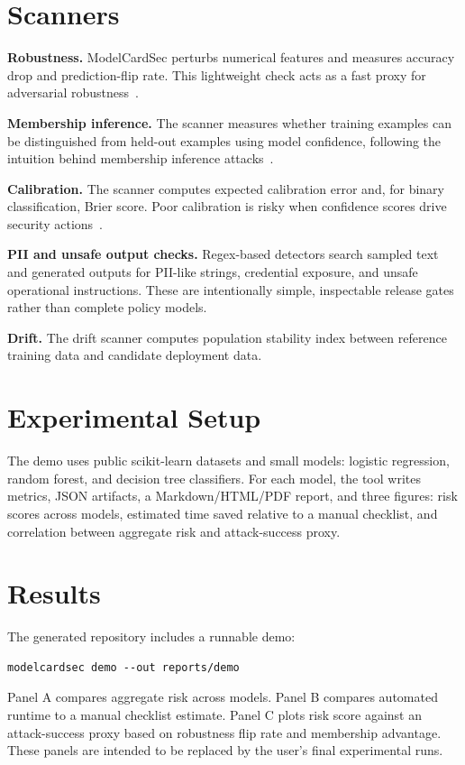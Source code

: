 \documentclass[10pt,conference]{IEEEtran}
\begin{document}
\section{Scanners}
\textbf{Robustness.} ModelCardSec perturbs numerical features and measures accuracy drop and prediction-flip rate. This lightweight check acts as a fast proxy for adversarial robustness~\cite{biggio2018wild}.

\textbf{Membership inference.} The scanner measures whether training examples can be distinguished from held-out examples using model confidence, following the intuition behind membership inference attacks~\cite{shokri2017membership}.

\textbf{Calibration.} The scanner computes expected calibration error and, for binary classification, Brier score. Poor calibration is risky when confidence scores drive security actions~\cite{guo2017calibration}.

\textbf{PII and unsafe output checks.} Regex-based detectors search sampled text and generated outputs for PII-like strings, credential exposure, and unsafe operational instructions. These are intentionally simple, inspectable release gates rather than complete policy models.

\textbf{Drift.} The drift scanner computes population stability index between reference training data and candidate deployment data.

\section{Experimental Setup}
The demo uses public scikit-learn datasets and small models: logistic regression, random forest, and decision tree classifiers. For each model, the tool writes metrics, JSON artifacts, a Markdown/HTML/PDF report, and three figures: risk scores across models, estimated time saved relative to a manual checklist, and correlation between aggregate risk and attack-success proxy.

\section{Results}
The generated repository includes a runnable demo:
\begin{verbatim}
modelcardsec demo --out reports/demo
\end{verbatim}
Panel A compares aggregate risk across models. Panel B compares automated runtime to a manual checklist estimate. Panel C plots risk score against an attack-success proxy based on robustness flip rate and membership advantage. These panels are intended to be replaced by the user's final experimental runs.
\end{document}
